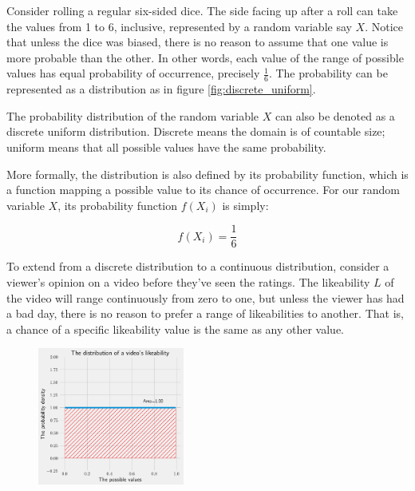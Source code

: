 \documentclass[a4paper,11pt]{article}
\begin{document}
Consider rolling a regular six-sided dice. The side facing up after a roll can take the values from 1 to 6, inclusive, represented by a random variable say $X$. Notice that unless the dice was biased, there is no reason to assume that one value is more probable than the other. In other words, each value of the range of possible values has equal probability of occurrence, precisely $\frac{1}{6}$. The probability can be represented as a distribution as in figure \ref{fig:discrete_uniform}.

The probability distribution of the random variable $X$ can also be denoted as a discrete uniform distribution. Discrete means the domain is of countable size; uniform means that all possible values have the same probability.

More formally, the distribution is also defined by its probability function, which is a function mapping a possible value to its chance of occurrence. For our random variable $X$, its probability function $f(X_i)$ is simply:

\[
    f(X_i) = \frac{1}{6}
\]


To extend from a discrete distribution to a continuous distribution, consider a viewer's opinion on a video before they've seen the ratings. The likeability $L$ of the video will range continuously from zero to one, but unless the viewer has had a bad day, there is no reason to prefer a range of likeabilities to another. That is, a chance of a specific likeability value is the same as any other value.

\begin{figure}
    \includegraphics[width=0.43\textwidth,right]{assets/uniform_pdfs.png}
    \caption{}
    \label{fig:uniform}
\end{figure}
\end{document}
